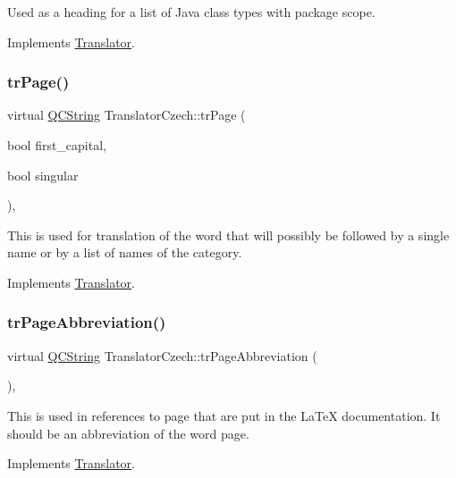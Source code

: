 Used as a heading for a list of Java class types with package scope. 

Implements \mbox{\hyperlink{class_translator}{Translator}}.

\mbox{\label{class_translator_czech_a99ddd126be16149eed47e3c607bb620c}} 
\subsubsection{\texorpdfstring{trPage()}{trPage()}}
{\footnotesize\ttfamily virtual \mbox{\hyperlink{class_q_c_string}{Q\+C\+String}} Translator\+Czech\+::tr\+Page (\begin{DoxyParamCaption}\item[{bool}]{first\+\_\+capital,  }\item[{bool}]{singular }\end{DoxyParamCaption})\hspace{0.3cm}{\ttfamily [inline]}, {\ttfamily [virtual]}}

This is used for translation of the word that will possibly be followed by a single name or by a list of names of the category. 

Implements \mbox{\hyperlink{class_translator}{Translator}}.

\mbox{\label{class_translator_czech_a49aa917d4f38759122d8bd33ca40f830}} 
\subsubsection{\texorpdfstring{trPageAbbreviation()}{trPageAbbreviation()}}
{\footnotesize\ttfamily virtual \mbox{\hyperlink{class_q_c_string}{Q\+C\+String}} Translator\+Czech\+::tr\+Page\+Abbreviation (\begin{DoxyParamCaption}{ }\end{DoxyParamCaption})\hspace{0.3cm}{\ttfamily [inline]}, {\ttfamily [virtual]}}

This is used in references to page that are put in the La\+TeX documentation. It should be an abbreviation of the word page. 

Implements \mbox{\hyperlink{class_translator}{Translator}}.

